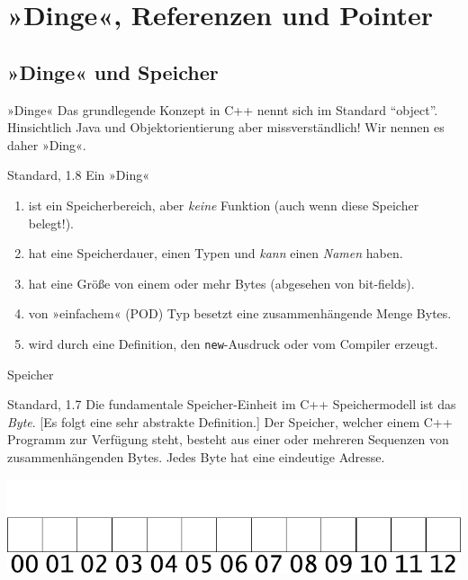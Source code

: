 \section{»Dinge«, Referenzen und Pointer}


\subsection{»Dinge« und Speicher}

\begin{frame}[fragile]{»Dinge«}
	Das grundlegende Konzept in C++ nennt sich im Standard \enquote{object}. Hinsichtlich Java und Objektorientierung aber missverständlich!
	Wir nennen es daher »Ding«.
	
	\pause
	
	\begin{block}{Standard, 1.8}
		Ein »Ding«
		\begin{enumerate}
			\item ist ein Speicherbereich, aber \emph{keine} Funktion {\tiny(auch wenn diese Speicher belegt!)}.
			\item hat eine Speicherdauer, einen Typen und \emph{kann} einen \emph{Namen} haben.
			\item {\scriptsize hat eine Größe von einem oder mehr Bytes {\tiny (abgesehen von bit-fields)}.}
			\item {\scriptsize von »einfachem« {\tiny (POD)} Typ besetzt eine zusammenhängende Menge Bytes.}
			\item {\scriptsize wird durch eine Definition, den \verb|new|-Ausdruck oder vom Compiler erzeugt.}
		\end{enumerate}
	\end{block}
\end{frame}

\begin{frame}[fragile]{Speicher}
	\begin{block}{Standard, 1.7}
		Die fundamentale Speicher-Einheit im C++ Speichermodell ist das \emph{Byte}. [Es folgt eine sehr abstrakte Definition.]
		Der Speicher, welcher einem C++ Programm zur Verfügung steht, besteht aus einer oder mehreren Sequenzen von zusammenhängenden Bytes.
		Jedes Byte hat eine eindeutige Adresse.
	\end{block}
	
	\pause
	
	\includegraphics[width=\linewidth]{images/free}
\end{frame}


